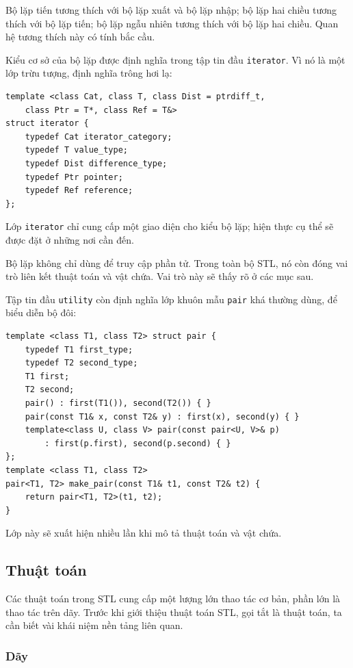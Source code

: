 \documentclass[11pt]{article}
\begin{document}
Bộ lặp tiến tương thích với bộ lặp xuất và bộ lặp nhập; bộ lặp hai chiều
tương thích với bộ lặp tiến; bộ lặp ngẫu nhiên tương thích với bộ lặp hai
chiều. Quan hệ tương thích này có tính bắc cầu.

Kiểu cơ sở của bộ lặp được định nghĩa trong tập tin đầu \verb|iterator|. Vì
nó là một lớp trừu tượng, định nghĩa trông hơi lạ:

\begin{verbatim}
template <class Cat, class T, class Dist = ptrdiff_t,
    class Ptr = T*, class Ref = T&>
struct iterator {
    typedef Cat iterator_category;
    typedef T value_type;
    typedef Dist difference_type;
    typedef Ptr pointer;
    typedef Ref reference;
};
\end{verbatim}

Lớp \verb|iterator| chỉ cung cấp một giao diện cho kiểu bộ lặp; hiện thực cụ
thể sẽ được đặt ở những nơi cần đến.

Bộ lặp không chỉ dùng để truy cập phần tử. Trong toàn bộ STL, nó còn đóng vai
trò liên kết thuật toán và vật chứa. Vai trò này sẽ thấy rõ ở các mục sau.

Tập tin đầu \verb|utility| còn định nghĩa lớp khuôn mẫu \verb|pair| khá
thường dùng, để biểu diễn bộ đôi:

\begin{verbatim}
template <class T1, class T2> struct pair {
    typedef T1 first_type;
    typedef T2 second_type;
    T1 first;
    T2 second;
    pair() : first(T1()), second(T2()) { }
    pair(const T1& x, const T2& y) : first(x), second(y) { }
    template<class U, class V> pair(const pair<U, V>& p)
        : first(p.first), second(p.second) { }
};
template <class T1, class T2>
pair<T1, T2> make_pair(const T1& t1, const T2& t2) {
    return pair<T1, T2>(t1, t2);
}
\end{verbatim}

Lớp này sẽ xuất hiện nhiều lần khi mô tả thuật toán và vật chứa.

\subsection{Thuật toán}

Các thuật toán trong STL cung cấp một lượng lớn thao tác cơ bản, phần lớn là
thao tác trên dãy. Trước khi giới thiệu thuật toán STL, gọi tắt là thuật toán,
ta cần biết vài khái niệm nền tảng liên quan.

\subsubsection*{Dãy}
\end{document}
